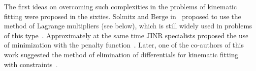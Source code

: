 
The first ideas on overcoming such complexities in the problems of kinematic fitting were proposed in the sixties.
Solmitz and Berge in~\cite{b1} proposed to use the method of Lagrange multipliers (see below), which is still widely used in problems of this type~\cite{b4}. %
Approximately at the same time JINR specialists proposed the use of minimization with the penalty function~\cite{b5}. %
Later, one of the co-authors of this work suggested the method of elimination of differentials for kinematic fitting with constraints~\cite{b6}.
